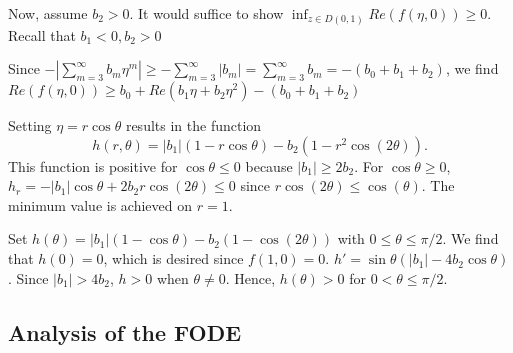 \documentclass[11pt]{article} %
\begin{document}
Now, assume $b_2>0$. It would suffice to show $\inf_{z\in D(0,1)}Re(f(\eta, 0))\ge 0$. Recall that $b_1<0, b_2>0$

Since $-|\sum_{m=3}^{\infty}b_m\eta^m|\ge -\sum_{m=3}^{\infty}|b_m|
=\sum_{m=3}^{\infty}b_m=-(b_0+b_1+b_2)$, we find 
 $Re(f(\eta,0))\ge b_0+Re(b_1\eta+b_2\eta^2)-(b_0+b_1+b_2)$

Setting $\eta=r\cos\theta$ results in the function $$
h(r,\theta)=|b_1|(1-r\cos\theta)-b_2(1-r^2\cos(2\theta)).
$$
This function is positive for $\cos\theta\le 0$ because $|b_1|\ge 2b_2$. For $\cos\theta\ge 0$, $h_r=-|b_1|\cos\theta+2b_2r\cos(2\theta)\le 0$ since $r\cos(2\theta)\le\cos(\theta)$. The minimum value is achieved on $r=1$. 

Set $h(\theta)=|b_1|(1-\cos\theta)-b_2(1-\cos(2\theta))$ with $0\le\theta\le \pi/2$. We find that $h(0)=0$, which is desired since $f(1,0)=0$. $h'=\sin\theta (|b_1|-4b_2\cos\theta)$. Since $|b_1|>4b_2$, $h>0$ when $\theta\neq 0$.  Hence, $h(\theta)>0$ for $0<\theta\le \pi/2$.

\subsection{Analysis of the FODE}
\end{document}
